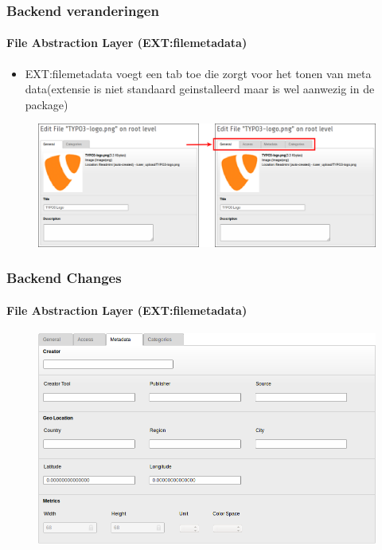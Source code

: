 
\begin{frame}[fragile]
	\frametitle{Backend veranderingen}
	\framesubtitle{File Abstraction Layer (EXT:filemetadata)}

	\begin{itemize}
		\item EXT:filemetadata voegt een tab toe die zorgt voor het tonen van meta data(extensie is niet standaard geinstalleerd maar is wel aanwezig in de package)
	\end{itemize}

	\begin{figure}
		\includegraphics[width=0.95\linewidth]{Images/BackendChanges/FileMetaDataTabs.png}
	\end{figure}

\end{frame}


\begin{frame}[fragile]
	\frametitle{Backend Changes}
	\framesubtitle{File Abstraction Layer (EXT:filemetadata)}

	\begin{figure}
		\includegraphics[width=0.8\linewidth]{Images/BackendChanges/FileMetaData.png}
	\end{figure}

\end{frame}

